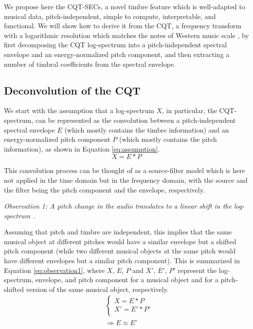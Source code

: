 \documentclass[journal]{IEEEtran}
\begin{document}
We propose here the CQT-SECs, a novel timbre feature which is well-adapted to musical data, pitch-independent, simple to compute, interpretable, and functional. We will show how to derive it from the CQT, a frequency transform with a logarithmic resolution which matches the notes of Western music scale \cite{brown1991, brown1992}, by first decomposing the CQT log-spectrum into a pitch-independent spectral envelope and an energy-normalized pitch component, and then extracting a number of timbral coefficients from the spectral envelope. 

\subsection{Deconvolution of the CQT}

We start with the assumption that a log-spectrum $X$, in particular, the CQT-spectrum, can be represented as the convolution between a pitch-independent spectral envelope $E$ (which mostly contains the timbre information) and an energy-normalized pitch component $P$ (which mostly contains the pitch information), as shown in Equation \ref{eq:assumption}. 
\begin{equation}
\label{eq:assumption}
X = E * P
\end{equation}

This convolution process can be thought of as a source-filter model \cite{fant1970} which is here not applied in the time domain but in the frequency domain, with the source and the filter being the pitch component and the envelope, respectively.

\emph{Observation 1: A pitch change in the audio translates to a linear shift in the log-spectrum \cite{brown1991, brown1992}.}

Assuming that pitch and timbre are independent, this implies that the same musical object at different pitches would have a similar envelope but a shifted pitch component (while two different musical objects at the same pitch would have different envelopes but a similar pitch component). This is summarized in Equation \ref{eq:observation1}, where $X$, $E$, $P$ and $X'$, $E'$, $P'$ represent the log-spectrum, envelope, and pitch component for a musical object and for a pitch-shifted version of the same musical object, respectively.
\begin{equation}
\label{eq:observation1}
\begin{split}
& \begin{cases}
X = E * P \\
X' = E' * P' \\
\end{cases} \\
& \Rightarrow E \approx E'
\end{split}
\end{equation}
\end{document}
